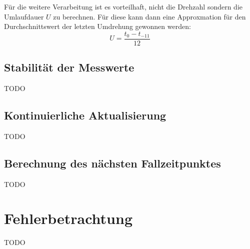 Für die weitere Verarbeitung ist es vorteilhaft, nicht die Drehzahl sondern die Umlaufdauer $U$ zu berechnen.
Für diese kann dann eine Approxmation für den Durchschnittswert der letzten Umdrehung gewonnen werden:
\begin{equation*}
U = \frac{t_0 - t_{-11}}{12}
\end{equation*}

\subsection{Stabilität der Messwerte}\label{design_stabilitaet}
TODO


\subsection{Kontinuierliche Aktualisierung}\label{design_aktualisierung}
TODO

\subsection{Berechnung des nächsten Fallzeitpunktes}\label{design_zeitpunkt}
TODO

\section{Fehlerbetrachtung}
TODO
